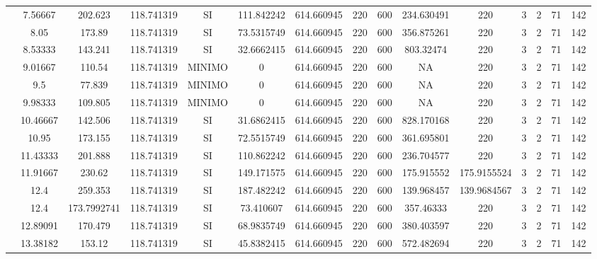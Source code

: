 \begin{table}[H]
{\begin{tabular}{|c|c|c|c|c|c|c|c|c|c|c|c|c|c|c|}
\cline{2-15}    & 7.56667 & 202.623 & 118.741319 & SI  & 111.842242 & 614.660945 & 220 & 600 & 234.630491 & 220 & 3   & 2   & 71  & 142 \bigstrut\\
\cline{2-15}    & 8.05 & 173.89 & 118.741319 & SI  & 73.5315749 & 614.660945 & 220 & 600 & 356.875261 & 220 & 3   & 2   & 71  & 142 \bigstrut\\
\cline{2-15}    & 8.53333 & 143.241 & 118.741319 & SI  & 32.6662415 & 614.660945 & 220 & 600 & 803.32474 & 220 & 3   & 2   & 71  & 142 \bigstrut\\
\cline{2-15}    & 9.01667 & 110.54 & 118.741319 & MINIMO & 0   & 614.660945 & 220 & 600 & NA  & 220 & 3   & 2   & 71  & 142 \bigstrut\\
\cline{2-15}    & 9.5 & 77.839 & 118.741319 & MINIMO & 0   & 614.660945 & 220 & 600 & NA  & 220 & 3   & 2   & 71  & 142 \bigstrut\\
\cline{2-15}    & 9.98333 & 109.805 & 118.741319 & MINIMO & 0   & 614.660945 & 220 & 600 & NA  & 220 & 3   & 2   & 71  & 142 \bigstrut\\
\cline{2-15}    & 10.46667 & 142.506 & 118.741319 & SI  & 31.6862415 & 614.660945 & 220 & 600 & 828.170168 & 220 & 3   & 2   & 71  & 142 \bigstrut\\
\cline{2-15}    & 10.95 & 173.155 & 118.741319 & SI  & 72.5515749 & 614.660945 & 220 & 600 & 361.695801 & 220 & 3   & 2   & 71  & 142 \bigstrut\\
\cline{2-15}    & 11.43333 & 201.888 & 118.741319 & SI  & 110.862242 & 614.660945 & 220 & 600 & 236.704577 & 220 & 3   & 2   & 71  & 142 \bigstrut\\
\cline{2-15}    & 11.91667 & 230.62 & 118.741319 & SI  & 149.171575 & 614.660945 & 220 & 600 & 175.915552 & 175.9155524 & 3   & 2   & 71  & 142 \bigstrut\\
\cline{2-15}    & 12.4 & 259.353 & 118.741319 & SI  & 187.482242 & 614.660945 & 220 & 600 & 139.968457 & 139.9684567 & 3   & 2   & 71  & 142 \bigstrut\\
\cline{2-15}    & 12.4 & 173.7992741 & 118.741319 & SI  & 73.410607 & 614.660945 & 220 & 600 & 357.46333 & 220 & 3   & 2   & 71  & 142 \bigstrut\\
\cline{2-15}    & 12.89091 & 170.479 & 118.741319 & SI  & 68.9835749 & 614.660945 & 220 & 600 & 380.403597 & 220 & 3   & 2   & 71  & 142 \bigstrut\\
\cline{2-15}    & 13.38182 & 153.12 & 118.741319 & SI  & 45.8382415 & 614.660945 & 220 & 600 & 572.482694 & 220 & 3   & 2   & 71  & 142 \bigstrut\\

\end{tabular}}
\end{table}
